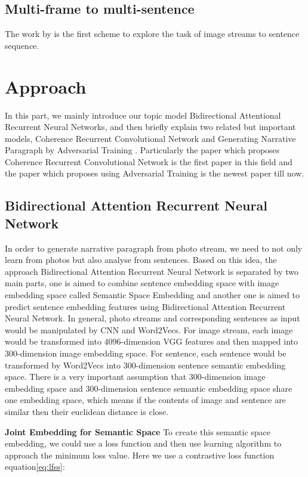 \documentclass[11pt]{article}
\begin{document}
		
\subsection{Multi-frame to multi-sentence}
The work by is the first scheme to explore the task of image streams to sentence sequence.		
		
		
\section{Approach}
In this part, we mainly introduce our topic model Bidirectional Attentional Recurrent Neural Networks, and then briefly explain two related but important models, Coherence Recurrent Convolutional Network \cite{NIPS2015_5776} and Generating Narrative Paragraph by Adversarial Training \cite{show-reward-tell-automatic-generation-narrative-paragraph-photo-stream-adversarial-training}. Particularly  the paper which proposes Coherence Recurrent Convolutional Network is the first paper in this field and the paper which proposes using Adversarial Training is the newest paper till now.

		
\subsection{Bidirectional Attention Recurrent Neural Network}
In order to generate narrative paragraph from photo stream, we need to not only learn from photos but also analyse from sentences. Based on this idea, the approach Bidirectional Attention Recurrent Neural Network is separated by two main parts, one is aimed to combine sentence embedding space with image embedding space called Semantic Space Embedding and another one is aimed to predict sentence embedding features using Bidirectional Attention Recurrent Neural Network. In general, photo streams and corresponding sentences as input would be manipulated by CNN and Word2Vecs. For image stream, each image would be transformed into 4096-dimension VGG features \cite{Simonyan14c}and then mapped into 300-dimension image embedding space. For sentence, each sentence would be transformed by Word2Vecs \cite{DBLP:journals/corr/MikolovSCCD13}into 300-dimension sentence semantic embedding space. There is a very important assumption that 300-dimension image embedding space and 300-dimension sentence semantic embedding space share one embedding space, which means if the contents of image and sentence are similar then their euclidean distance is close. 

{\bf Joint Embedding for Semantic Space}  To create this semantic space embedding, we could use a loss function and then use learning algorithm to approach the minimum loss value. Here we use a contrastive loss function equation\ref{eq:lfss}:
\end{document}
